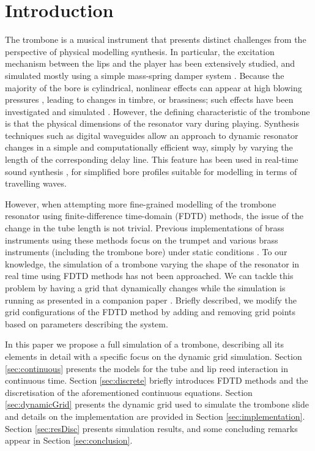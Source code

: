 \section{Introduction}\label{sec:introduction}

The trombone is a musical instrument that presents distinct challenges from the perspective of physical modelling synthesis.
In particular, the excitation mechanism between the lips and the player has been extensively studied, and simulated mostly using a simple mass-spring damper system \cite{campbell2004brass}.
Because the majority of the bore is cylindrical, nonlinear effects can appear at high blowing pressures \cite{Hirschberg96}, leading to changes in timbre, or brassiness; such effects have been investigated and simulated
\cite{campbell2004brass, msallam1997physical,msallam2000physical}.
However, the defining characteristic of the trombone is that the physical dimensions of the resonator vary during playing.
Synthesis techniques such as digital waveguides allow an approach to dynamic resonator changes in a simple and computationally efficient way, simply by varying the length of the corresponding delay line. This feature has been used in real-time sound synthesis \cite{cook2002real}, for simplified bore profiles suitable for modelling in terms of travelling waves.

However, when attempting more fine-grained modelling of the trombone resonator using finite-difference time-domain (FDTD) methods, the issue of the change in the tube length is not trivial. Previous implementations of brass instruments using these methods focus on the trumpet \cite{harrison2015environment} and various brass instruments (including the trombone bore) under static conditions \cite{Bilbao2013}. To our knowledge, the simulation of a trombone varying the shape of the resonator in real time using FDTD methods has not been approached.
We can tackle this problem by having a grid that dynamically changes while the simulation is running as presented in a companion paper \cite{Willemsen2021}. Briefly described, we modify the grid configurations of the FDTD method by adding and removing grid points based on parameters describing the system. 

In this paper we propose a full simulation of a trombone, describing all its elements in detail with a specific focus on the dynamic grid simulation. Section \ref{sec:continuous} presents the models for the tube and lip reed interaction in continuous time. Section \ref{sec:discrete} briefly introduces FDTD methods and the discretisation of the aforementioned continuous equations. Section \ref{sec:dynamicGrid} presents the dynamic grid used to simulate the trombone slide and details on the implementation are provided in Section \ref{sec:implementation}. Section \ref{sec:resDisc} presents simulation results, and some concluding remarks appear in Section \ref{sec:conclusion}.